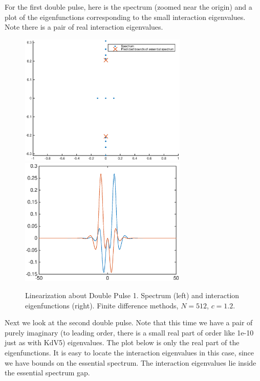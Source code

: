 \documentclass[12pt]{article}
\begin{document}
For the first double pulse, here is the spectrum (zoomed near the origin) and a plot of the eigenfunctions corresponding to the small interaction eigenvalues. Note there is a pair of real interaction eigenvalues.

\begin{figure}[H]
\centering
\includegraphics[width=8cm]{spec12_double1.eps}
\includegraphics[width=8cm]{evecs12_double1.eps}
\caption{Linearization about Double Pulse 1. Spectrum (left) and interaction eigenfunctions (right). Finite difference methods, $N = 512$, $c = 1.2$.}
\end{figure}

Next we look at the second double pulse. Note that this time we have a pair of purely imaginary (to leading order, there is a small real part of order like 1e-10 just as with KdV5) eigenvalues. The plot below is only the real part of the eigenfunctions. It is easy to locate the interaction eigenvalues in this case, since we have bounds on the essential spectrum. The interaction eigenvalues lie inside the essential spectrum gap.
\end{document}
